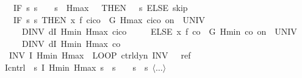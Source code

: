 \documentclass[envcountsame]{llncs}
\begin{document}
\begin{example}
\begin{isabellebody}
\ \ \ {\isacharparenleft}IF\ {\isacharparenleft}{\isasymlambda}s{\isachardot}\ s{\isachardollar}{}\ {\isacharequal}\ {}\ {\isasymand}\ s{\isachardollar}{}\ {\isasymge}\ Hmax\ {\isacharminus}\ {}{\isacharparenright}\ THEN\ {\isacharparenleft}{}\ {\isacharcolon}{\isacharcolon}{\isacharequal}\ {\isacharparenleft}{\isasymlambda}s{\isachardot}{}{\isacharparenright}{\isacharparenright}\ ELSE\ skip{\isacharparenright}{\isacharparenright}{\isacharsemicolon}\isanewline
\ \ \ %
\isanewline
\ \ \ {\isacharparenleft}IF\ {\isacharparenleft}{\isasymlambda}s{\isachardot}\ s{\isachardollar}{}{\isacharequal}{}{\isacharparenright}\ THEN\ {\isacharparenleft}x{\isasymacute}{\isacharequal}\ f\ {\isacharparenleft}c\isactrlsub i{\isacharminus}c\isactrlsub o{\isacharparenright}\ {\isacharampersand}\ G\ Hmax\ {\isacharparenleft}c\isactrlsub i{\isacharminus}c\isactrlsub o{\isacharparenright}\ on\ {\isacharbraceleft}{}{\isachardot}{\isachardot}{\isasymtau}{\isacharbraceright}\ UNIV\ {\isacharat}\ {}\isanewline 
\ \ \ \ \ DINV\ {\isacharparenleft}dI\ Hmin\ Hmax\ {\isacharparenleft}c\isactrlsub i{\isacharminus}c\isactrlsub o{\isacharparenright}{\isacharparenright}{\isacharparenright}\ \isanewline
\ \ \ \ ELSE\ {\isacharparenleft}x{\isasymacute}{\isacharequal}\ f\ {\isacharparenleft}{\isacharminus}c\isactrlsub o{\isacharparenright}\ {\isacharampersand}\ G\ Hmin\ {\isacharparenleft}{\isacharminus}c\isactrlsub o{\isacharparenright}\ on\ {\isacharbraceleft}{}{\isachardot}{\isachardot}{\isasymtau}{\isacharbraceright}\ UNIV\ {\isacharat}\ {}\isanewline 
\ \ \ \ \ DINV\ {\isacharparenleft}dI\ Hmin\ Hmax\ {\isacharparenleft}{\isacharminus}c\isactrlsub o{\isacharparenright}{\isacharparenright}{\isacharparenright}{\isacharparenright}\ {\isacharparenright}\isanewline
\ \ INV\ I\ Hmin\ Hmax{\isacharparenright}{\isachardoublequoteclose}\ {\isacharparenleft}\ {\isachardoublequoteopen}LOOP\ {\isacharparenleft}{\isacharquery}ctrl{\isacharsemicolon}{\isacharquery}dyn{\isacharparenright}\ INV\ {\isacharunderscore}\ {\isasymle}\ {\isacharquery}ref{\isachardoublequoteclose}{\isacharparenright}\isanewline
{}\isamarkupfalse%
{\isacharminus}\isanewline
\ \ \isanewline
\ \ \isamarkupfalse%
\ {\isacharquery}Icntrl\ {\isacharequal}\ {\isachardoublequoteopen}{\isasymlambda}s{\isachardot}\ I\ Hmin\ Hmax\ s\ {\isasymand}\ s{\isachardollar}{}\ {\isacharequal}\ {}\ {\isasymand}\ s{\isachardollar}{}\ {\isacharequal}\ s{\isachardollar}{}{\isachardoublequoteclose}\ $\langle \dots\rangle$\isanewline

\end{isabellebody}
\end{example}
\end{document}
